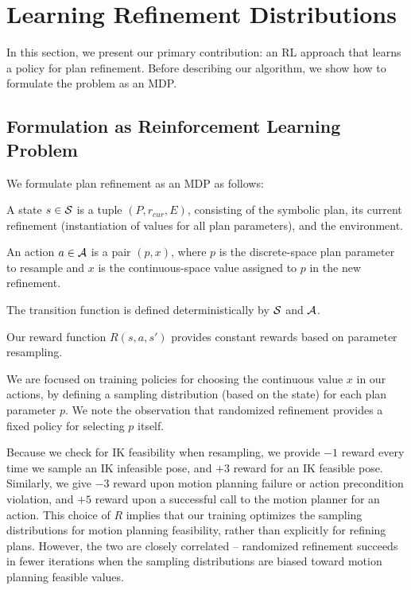 \section{Learning Refinement Distributions}
In this section, we present our primary contribution: an RL
approach that learns a policy for plan refinement. Before describing our
algorithm, we show how to formulate the problem as an MDP.

\subsection{Formulation as Reinforcement Learning Problem}
We formulate plan refinement as an MDP as follows:
\begin{tightlist}
\item A state $s \in \mathcal{S}$ is a tuple $(P, r_{cur}, E)$, consisting of the
symbolic plan, its current refinement (instantiation of values for all plan parameters),
and the environment.
\item An action $a \in \mathcal{A}$ is a pair $(p, x)$, where $p$ is the discrete-space plan
parameter to resample and $x$ is the continuous-space value assigned to $p$ in the new refinement.
\item The transition function is defined deterministically by $\mathcal{S}$ and $\mathcal{A}$.
\item Our reward function $R(s, a, s')$ provides constant rewards based on parameter resampling.
\end{tightlist}

We are focused on training policies for choosing the continuous value
$x$ in our actions, by defining a sampling distribution (based on the state) for each plan parameter $p$.
We note the observation that randomized refinement provides a fixed policy for selecting $p$ itself.

Because we check for IK feasibility when resampling, we provide $-1$ reward every
time we sample an IK infeasible pose, and $+3$ reward for an IK feasible pose.
Similarly, we give $-3$ reward upon motion planning failure or action precondition violation,
and $+5$ reward upon a successful call to the motion planner for an action.
This choice of $R$ implies that our training optimizes the sampling distributions for
motion planning feasibility, rather than explicitly for refining plans. However, the two are
closely correlated -- randomized refinement succeeds in fewer iterations when the sampling
distributions are biased toward motion planning feasible values.

